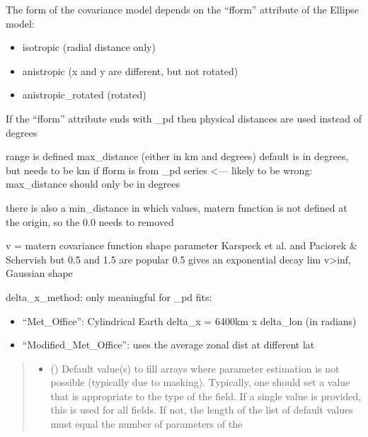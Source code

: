\documentclass[letterpaper,10pt,english]{sphinxmanual}
\begin{document}
\begin{fulllineitems}
\begin{fulllineitems}
\sphinxAtStartPar
The form of the covariance model depends on the “fform” attribute of the
Ellipse model:
\begin{itemize}
\item {}
\sphinxAtStartPar
isotropic (radial distance only)

\item {}
\sphinxAtStartPar
anistropic (x and y are different, but not rotated)

\item {}
\sphinxAtStartPar
anistropic\_rotated (rotated)

\end{itemize}

\sphinxAtStartPar
If the “fform” attribute ends with \_pd then physical distances are used
instead of degrees

\sphinxAtStartPar
range is defined max\_distance (either in km and degrees)
default is in degrees, but needs to be km if fform is from \_pd series
\textless{}— likely to be wrong: max\_distance should only be in degrees

\sphinxAtStartPar
there is also a min\_distance in which values,
matern function is not defined at the origin, so the 0.0 needs to
removed

\sphinxAtStartPar
v = matern covariance function shape parameter
Karspeck et al.  and Paciorek \& Schervish
but 0.5 and 1.5 are popular 0.5 gives an exponential decay
lim v\textendash{}\textgreater{}inf, Gaussian shape

\sphinxAtStartPar
delta\_x\_method: only meaningful for \_pd fits:
\begin{itemize}
\item {}
\sphinxAtStartPar
“Met\_Office”: Cylindrical Earth delta\_x = 6400km x delta\_lon
(in radians)

\item {}
\sphinxAtStartPar
“Modified\_Met\_Office”: uses the average zonal dist at different
lat

\end{itemize}
\begin{quote}\begin{description}
\begin{itemize}
\item {}
\sphinxAtStartPar
{} () \textendash{} Default value(s) to fill arrays where parameter estimation is not
possible (typically due to masking). Typically, one should set a
value that is appropriate to the type of the field. If a single
value is provided, this is used for all fields. If not, the length
of the list of default values must equal the number of parameters
of the 


\end{itemize}
\end{description}
\end{quote}
\end{fulllineitems}
\end{fulllineitems}
\end{document}
